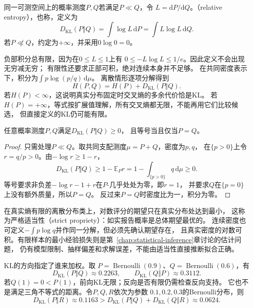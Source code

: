 \begin{definition}[相对熵]
\label{def:information-kl-divergence}
同一可测空间上的概率测度\(P,Q\)若满足\(P\ll Q\)，令
\(L=\mathrm dP/\mathrm dQ\)。（relative entropy），也称，定义为
\begin{equation}
  D_{\mathrm{KL}}(P\Vert Q)
  =\int\log L\,\mathrm dP=\int L\log L\,\mathrm dQ.
  \label{eq:information-kl-divergence}
\end{equation}
若\(P\not\ll Q\)，约定为\(+\infty\)，并采用\(0\log0=0\)。
\end{definition}

负部积分总有限，因为在\(0\leq L\leq1\)上有
\(0\leq-L\log L\leq1/e\)。因此定义不会出现无穷减无穷；
有限性还要求正部可积，绝对连续本身并不足够。
在共同密度表示下，积分为\(\int p\log(p/q)\,\mathrm d\mu\)。
离散情形逐项分解得到
\begin{equation}
  H(P,Q)=H(P)+D_{\mathrm{KL}}(P\Vert Q).
  \label{eq:information-cross-entropy-decomposition}
\end{equation}
若\(H(P)<\infty\)，这说明真实分布固定时交叉熵的多余代价恰是KL。
若\(H(P)=+\infty\)，等式按扩展值理解，所有交叉熵都无限，不能再用它们比较候选，
但直接定义的KL仍可能有限。

\begin{theorem}[Gibbs不等式]
\label{thm:information-gibbs-inequality}
任意概率测度\(P,Q\)满足\(D_{\mathrm{KL}}(P\Vert Q)\geq0\)，
且等号当且仅当\(P=Q\)。
\end{theorem}
\begin{proof}
只需处理\(P\ll Q\)。取共同支配测度\(\mu=P+Q\)，密度为\(p,q\)，
在\(\{p>0\}\)上令\(r=q/p>0\)。由\(-\log r\geq1-r\)，
\[
  D_{\mathrm{KL}}(P\Vert Q)
  \geq1-\mathbb E_Pr
  =1-\int_{\{p>0\}}q\,\mathrm d\mu\geq0.
\]
等号要求非负差\(-\log r-1+r\)在\(P\)-几乎处处为零，即\(r=1\)，
并要求\(Q\)在\(\{p=0\}\)上没有额外质量，所以\(P=Q\)。
反过来\(P=Q\)时密度比为一，积分为零。
\end{proof}

在真实熵有限的离散分布类上，对数评分的期望只在真实分布处达到最小，
这称为严格适当性（strict propriety）：如实报告概率是总体期望最优的。
连续密度也可定义\(-\int p\log q\)并作同一分解，但必须先确认期望存在，
且真实密度的对数可积。有限样本的最小经验损失则是第~\ref{chap:statistical-inference}章讨论的估计问题，
仍有模型限制、抽样偏差和求解误差，不能由适当性直接推断拟合正确。

KL的方向指定了谁来加权。取
\(P=\operatorname{Bernoulli}(0.9)\)、\(Q=\operatorname{Bernoulli}(0.6)\)，有
\[
  D_{\mathrm{KL}}(P\Vert Q)\approx0.2263,\qquad
  D_{\mathrm{KL}}(Q\Vert P)\approx0.3112.
\]
若\(Q(1)=0<P(1)\)，前向KL无限；反向是否有限仍需检查反向支持。
它也不是满足三角不等式的距离。令\(P,Q,R\)依次为参数
\(0.1,0.2,0.3\)的Bernoulli分布，则
\[
  D_{\mathrm{KL}}(P\Vert R)\approx0.1163
  >D_{\mathrm{KL}}(P\Vert Q)+D_{\mathrm{KL}}(Q\Vert R)
  \approx0.0624.
\]

